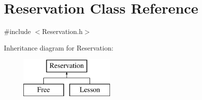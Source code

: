 \hypertarget{class_reservation}{}\section{Reservation Class Reference}
\label{class_reservation}


{\ttfamily \#include $<$Reservation.\+h$>$}

Inheritance diagram for Reservation\+:\begin{figure}[H]
\begin{center}
\leavevmode
\includegraphics[height=2.000000cm]{class_reservation}
\end{center}
\end{figure}
